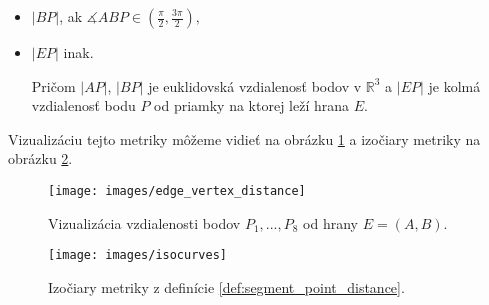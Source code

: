 \begin{enumerate}
{\begin{definition}
\begin{itemize}
            \item{
                $|BP|$, ak $\measuredangle ABP \in (\frac{\pi}{2}, \frac{3\pi}{2}),$
            }

            \item{
                $|EP|$ inak.
            }

            
            Pričom $|AP|$, $|BP|$ je euklidovská vzdialenosť bodov v $\mathbb{R}^3$ a $|EP|$ je kolmá 
            vzdialenosť bodu $P$ od priamky na ktorej leží hrana $E$.
        \end{itemize}

        \end{definition}

        Vizualizáciu tejto metriky môžeme vidieť na obrázku \ref{obr:edge_vertex_distance} a izočiary 
        metriky na obrázku \ref{obr:isocurves}.

        \begin{figure}
            \centerline{\texttt{[image: images/edge\_vertex\_distance]}}
            \caption[Vizualizácia vzdialenosti bodov od hrany]
            {Vizualizácia vzdialenosti bodov $P_1, ..., P_8$ od hrany $E=(A,B)$.}
            \label{obr:edge_vertex_distance}
        \end{figure}

        \begin{figure}
            \centerline{\texttt{[image: images/isocurves]}}
            \caption[Izočiary metriky]
            {Izočiary metriky z definície \ref{def:segment_point_distance}.}
            \label{obr:isocurves}
        \end{figure}



}
\end{enumerate}
